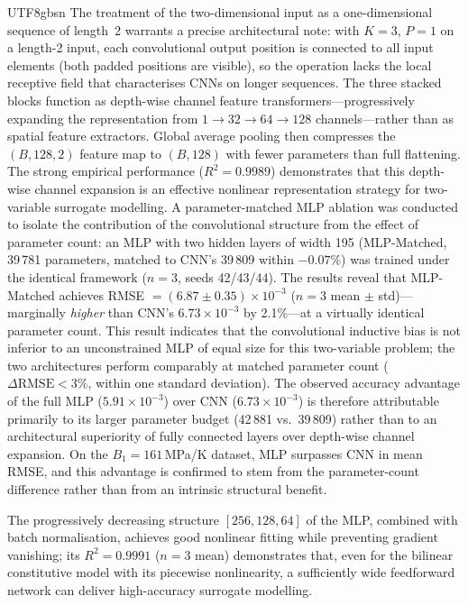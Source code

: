 \documentclass[a4paper,12pt]{report}
\begin{document}
\begin{CJK}{UTF8}{gbsn}
The treatment of the two-dimensional input as a one-dimensional sequence of length~2
warrants a precise architectural note: with $K{=}3$, $P{=}1$ on a length-2 input, each
convolutional output position is connected to all input elements (both padded positions
are visible), so the operation lacks the local receptive field that characterises CNNs
on longer sequences. The three stacked blocks function as depth-wise channel feature
transformers---progressively expanding the representation from $1 \to 32 \to 64 \to 128$
channels---rather than as spatial feature extractors. Global average pooling then
compresses the $(B,128,2)$ feature map to $(B,128)$ with fewer parameters than full
flattening. The strong empirical performance ($R^2=0.9989$) demonstrates that this
depth-wise channel expansion is an effective nonlinear representation strategy for
two-variable surrogate modelling. A parameter-matched MLP ablation was conducted to
isolate the contribution of the convolutional structure from the effect of parameter
count: an MLP with two hidden layers of width 195 (MLP-Matched, 39\,781 parameters,
matched to CNN's 39\,809 within $-0.07\%$) was trained under the identical framework
($n = 3$, seeds 42/43/44). The results reveal that MLP-Matched achieves RMSE
$= (6.87 \pm 0.35) \times 10^{-3}$ ($n=3$ mean $\pm$ std)---marginally \emph{higher}
than CNN's $6.73 \times 10^{-3}$ by 2.1\%---at a virtually identical parameter count.
This result indicates that the convolutional inductive bias is not inferior to an
unconstrained MLP of equal size for this two-variable problem; the two architectures
perform comparably at matched parameter count ($\Delta\mathrm{RMSE} < 3\%$, within
one standard deviation). The observed accuracy advantage of the full MLP
($5.91 \times 10^{-3}$) over CNN ($6.73 \times 10^{-3}$) is therefore attributable
primarily to its larger parameter budget (42\,881 vs.\ 39\,809) rather than to an
architectural superiority of fully connected layers over depth-wise channel expansion.
On the $B_1 = 161$\,MPa/K dataset, MLP surpasses CNN in mean RMSE, and this advantage
is confirmed to stem from the parameter-count difference rather than from an intrinsic
structural benefit.

The progressively decreasing structure $[256,128,64]$ of the MLP, combined with batch
normalisation, achieves good nonlinear fitting while preventing gradient vanishing; its
$R^2 = 0.9991$ ($n=3$ mean) demonstrates that, even for the bilinear constitutive model
with its piecewise nonlinearity, a sufficiently wide feedforward network can deliver
high-accuracy surrogate modelling.


\end{CJK}
\end{document}
